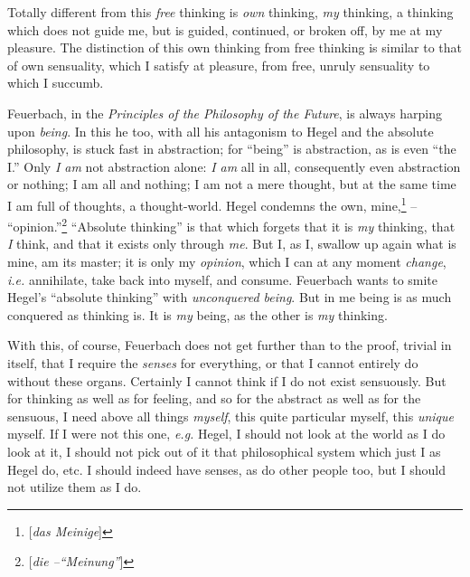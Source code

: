 Totally different from this \textit{free} thinking is \textit{own} thinking, 
\textit{my} thinking, a thinking which does not guide me, but is guided, 
continued, or broken off, by me at my pleasure. The distinction of this own 
thinking from free thinking is similar to that of own sensuality, which I 
satisfy at pleasure, from free, unruly sensuality to which I succumb.

Feuerbach, in the \textit{Principles of the Philosophy of the Future}, is 
always harping upon \textit{being}. In this he too, with all his antagonism to 
Hegel and the absolute philosophy, is stuck fast in abstraction; for 
``being'' is abstraction, as is even ``the I.'' Only \textit{I am} not 
abstraction alone: \textit{I am} all in all, consequently even abstraction or 
nothing; I am all and nothing; I am not a mere thought, but at the same time I 
am full of thoughts, a thought-world. Hegel condemns the own, 
mine,\footnote{[\textit{das Meinige}]} -- ``opinion.''\footnote{[\textit{die 
--``Meinung''}]} ``Absolute thinking'' is that which forgets that it is 
\textit{my} thinking, that \textit{I} think, and that it exists only through 
\textit{me}. But I, as I, swallow up again what is mine, am its master; it is 
only my \textit{opinion}, which I can at any moment \textit{change}, 
\textit{i.e.} annihilate, take back into myself, and consume. Feuerbach wants 
to smite Hegel's ``absolute thinking'' with \textit{unconquered being}. But 
in me being is as much conquered as thinking is. It is \textit{my} being, as 
the other is \textit{my} thinking.

With this, of course, Feuerbach does not get further than to the proof, 
trivial in itself, that I require the \textit{senses} for everything, or that 
I cannot entirely do without these organs. Certainly I cannot think if I do 
not exist sensuously. But for thinking as well as for feeling, and so for the 
abstract as well as for the sensuous, I need above all things \textit{myself}, 
this quite particular myself, this \textit{unique} myself. If I were not this 
one, \textit{e.g.} Hegel, I should not look at the world as I do look at it, 
I should not pick out of it that philosophical system which just I as Hegel 
do, etc. I should indeed have senses, as do other people too, but I should not 
utilize them as I do.

